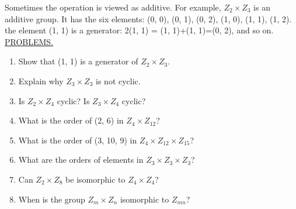 \documentclass[12pt]{book}
\theoremstyle{definition}
\begin{document}
Sometimes the operation is viewed as additive.  For example, $Z_2\times Z_3$ is an additive group.  It has the six elements: (0, 0), (0, 1), (0, 2), (1, 0), (1, 1), (1, 2).  the element (1, 1) is a generator: 2(1, 1) = (1, 1)+(1, 1)=(0, 2), and so on.\\[.1in]
\underline{PROBLEMS.}
\begin{enumerate}
\item Show that (1, 1) is a generator of $Z_2\times Z_3$.
\item Explain why $Z_3\times Z_3$ is not cyclic.
\item Is $Z_2\times Z_4$ cyclic?  Is $Z_3\times Z_4$ cyclic?
\item What is the order of (2, 6) in $Z_4\times Z_{12}$?
\item What is the order of (3, 10, 9) in $Z_4\times Z_{12}\times Z_{15}$?
\item What are the orders of elements in $Z_3\times Z_3\times Z_3$?
\item Can $Z_2\times Z_8$ be isomorphic to $Z_4\times Z_4$?
\item When is the group $Z_m \times Z_n$ isomorphic to $Z_{mn}$?
\end{enumerate}
\end{document}
